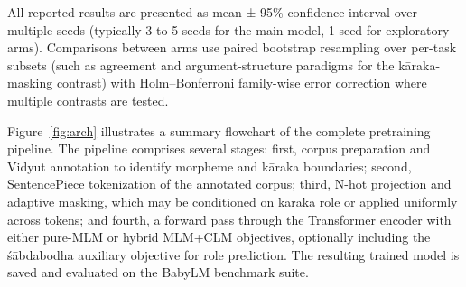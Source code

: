 
All reported results are presented as mean ± 95\% confidence interval over multiple seeds (typically 3 to 5 seeds for the main model, 1 seed for exploratory arms). Comparisons between arms use paired bootstrap resampling over per-task subsets (such as agreement and argument-structure paradigms for the kāraka-masking contrast) with Holm–Bonferroni family-wise error correction where multiple contrasts are tested.

Figure~\ref{fig:arch} illustrates a summary flowchart of the complete pretraining pipeline. The pipeline comprises several stages: first, corpus preparation and Vidyut annotation to identify morpheme and kāraka boundaries; second, SentencePiece tokenization of the annotated corpus; third, N-hot projection and adaptive masking, which may be conditioned on kāraka role or applied uniformly across tokens; and fourth, a forward pass through the Transformer encoder with either pure-MLM or hybrid MLM+CLM objectives, optionally including the śābdabodha auxiliary objective for role prediction. The resulting trained model is saved and evaluated on the BabyLM benchmark suite.

